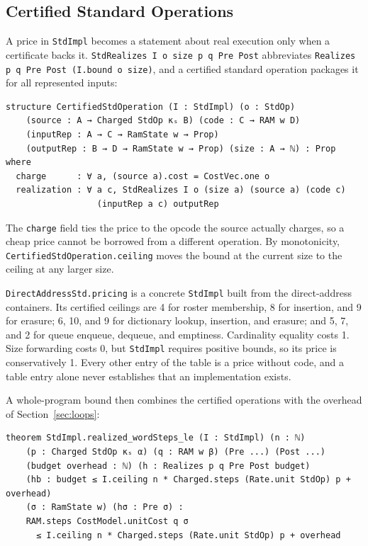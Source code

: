 \documentclass[acmsmall,nonacm]{acmart}
\begin{document}
\subsection{Certified Standard Operations}\label{sec:certified-std}

A price in \lstinline{StdImpl} becomes a statement about real execution only when a certificate backs it.
\lstinline{StdRealizes I o size p q Pre Post} abbreviates \lstinline{Realizes p q Pre Post (I.bound o size)}, and a certified standard operation packages it for all represented inputs:

\begin{lstlisting}
structure CertifiedStdOperation (I : StdImpl) (o : StdOp)
    (source : A → Charged StdOp κₛ B) (code : C → RAM w D)
    (inputRep : A → C → RamState w → Prop)
    (outputRep : B → D → RamState w → Prop) (size : A → ℕ) : Prop where
  charge      : ∀ a, (source a).cost = CostVec.one o
  realization : ∀ a c, StdRealizes I o (size a) (source a) (code c)
                  (inputRep a c) outputRep
\end{lstlisting}

The \lstinline{charge} field ties the price to the opcode the source actually charges, so a cheap price cannot be borrowed from a different operation.
By monotonicity, \lstinline{CertifiedStdOperation.ceiling} moves the bound at the current size to the ceiling at any larger size.

\lstinline{DirectAddressStd.pricing} is a concrete \lstinline{StdImpl} built from the direct-address containers.
Its certified ceilings are 4 for roster membership, 8 for insertion, and 9 for erasure; 6, 10, and 9 for dictionary lookup, insertion, and erasure; and 5, 7, and 2 for queue enqueue, dequeue, and emptiness.
Cardinality equality costs 1.
Size forwarding costs 0, but \lstinline{StdImpl} requires positive bounds, so its price is conservatively 1.
Every other entry of the table is a price without code, and a table entry alone never establishes that an implementation exists.

A whole-program bound then combines the certified operations with the overhead of Section~\ref{sec:loops}:

\begin{lstlisting}
theorem StdImpl.realized_wordSteps_le (I : StdImpl) (n : ℕ)
    (p : Charged StdOp κₛ α) (q : RAM w β) (Pre ...) (Post ...)
    (budget overhead : ℕ) (h : Realizes p q Pre Post budget)
    (hb : budget ≤ I.ceiling n * Charged.steps (Rate.unit StdOp) p + overhead)
    (σ : RamState w) (hσ : Pre σ) :
    RAM.steps CostModel.unitCost q σ
      ≤ I.ceiling n * Charged.steps (Rate.unit StdOp) p + overhead
\end{lstlisting}
\end{document}
